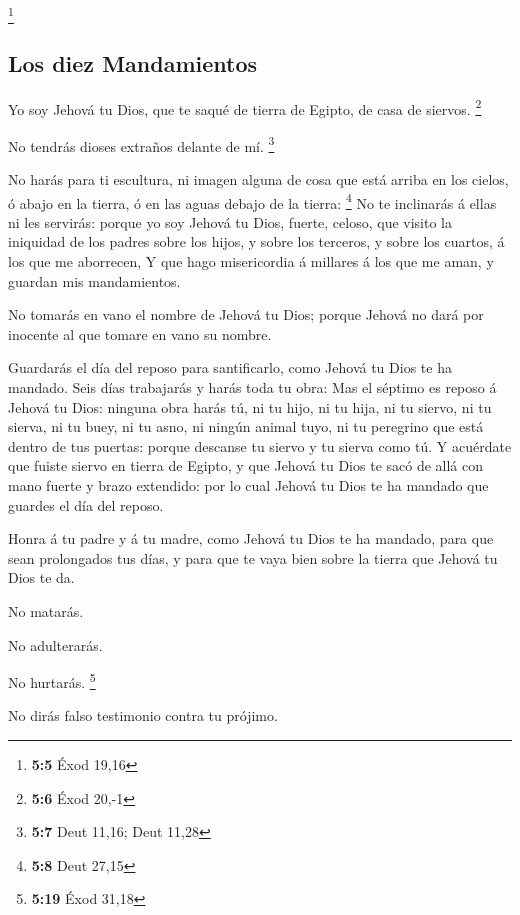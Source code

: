 \footnote{\textbf{5:5} Éxod 19,16}

\hypertarget{los-diez-mandamientos}{%
\subsection{Los diez Mandamientos}\label{los-diez-mandamientos}}

 Yo soy Jehová tu Dios, que te saqué de tierra de Egipto,
de casa de siervos. \footnote{\textbf{5:6} Éxod 20,-1}

 No tendrás dioses extraños delante de mí. \footnote{\textbf{5:7}
  Deut 11,16; Deut 11,28}

 No harás para ti escultura, ni imagen alguna de cosa que
está arriba en los cielos, ó abajo en la tierra, ó en las aguas debajo
de la tierra: \footnote{\textbf{5:8} Deut 27,15}  No te
inclinarás á ellas ni les servirás: porque yo soy Jehová tu Dios,
fuerte, celoso, que visito la iniquidad de los padres sobre los hijos, y
sobre los terceros, y sobre los cuartos, á los que me aborrecen,
 Y que hago misericordia á millares á los que me aman, y
guardan mis mandamientos.

 No tomarás en vano el nombre de Jehová tu Dios; porque
Jehová no dará por inocente al que tomare en vano su nombre.

 Guardarás el día del reposo para santificarlo, como
Jehová tu Dios te ha mandado.  Seis días trabajarás y
harás toda tu obra:  Mas el séptimo es reposo á Jehová tu
Dios: ninguna obra harás tú, ni tu hijo, ni tu hija, ni tu siervo, ni tu
sierva, ni tu buey, ni tu asno, ni ningún animal tuyo, ni tu peregrino
que está dentro de tus puertas: porque descanse tu siervo y tu sierva
como tú.  Y acuérdate que fuiste siervo en tierra de
Egipto, y que Jehová tu Dios te sacó de allá con mano fuerte y brazo
extendido: por lo cual Jehová tu Dios te ha mandado que guardes el día
del reposo.

 Honra á tu padre y á tu madre, como Jehová tu Dios te ha
mandado, para que sean prolongados tus días, y para que te vaya bien
sobre la tierra que Jehová tu Dios te da.

 No matarás.

 No adulterarás.

 No hurtarás. \footnote{\textbf{5:19} Éxod 31,18}

 No dirás falso testimonio contra tu prójimo.

